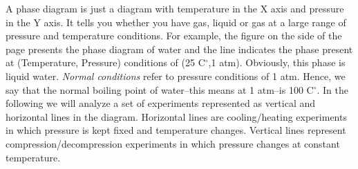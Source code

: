 \documentclass[main.tex]{subfiles}
\newcommand\chapterlabel{solids}
\begin{document}
\begin{description}
\begin{center}
\end{center}


\item[\docfilehook{Phase diagram of water}{}] A phase diagram is just a diagram with temperature in the X axis and pressure in the Y axis. It tells you whether you have gas, liquid or gas at a large range of pressure and temperature conditions. For example, the figure on the side of the page presents the phase diagram of water and the line indicates the phase present at (Temperature, Pressure) conditions of (25 C$^{\circ}$,1 atm). Obviously, this phase is liquid water. \emph{Normal conditions} refer to pressure conditions of 1 atm. Hence, we say that the normal boiling point of water--this means at 1 atm--is 100 C$^{\circ}$. In the following we will analyze a set of experiments represented as vertical and horizontal lines in the diagram. Horizontal lines are cooling/heating experiments in which pressure is kept fixed and temperature changes. Vertical lines represent compression/decompression experiments in which pressure changes at constant temperature.





\end{description}
\end{document}

